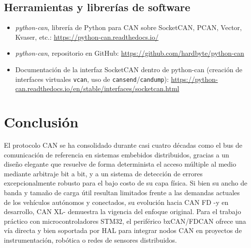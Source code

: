 \documentclass[pdflatex,sn-mathphys-num]{sn-jnl}%
\begin{document}
\subsection{Herramientas y librerías de software}
\begin{itemize}
    \item \textit{python-can}, librería de Python para CAN sobre SocketCAN, PCAN, Vector, Kvaser, etc.: \url{https://python-can.readthedocs.io/}
    \item \textit{python-can}, repositorio en GitHub: \url{https://github.com/hardbyte/python-can}
    \item Documentación de la interfaz SocketCAN dentro de python-can (creación de interfaces virtuales \texttt{vcan}, uso de \texttt{cansend}/\texttt{candump}): \url{https://python-can.readthedocs.io/en/stable/interfaces/socketcan.html}
\end{itemize}

\section{Conclusión}\label{sec:conclusion}
El protocolo CAN se ha consolidado durante casi cuatro décadas como el bus de comunicación de referencia en sistemas embebidos distribuidos, gracias a un diseño elegante que resuelve de forma determinista el acceso múltiple al medio mediante arbitraje bit a bit, y a un sistema de detección de errores excepcionalmente robusto para el bajo costo de su capa física. Si bien su ancho de banda y tamaño de carga útil resultan limitados frente a las demandas actuales de los vehículos autónomos y conectados, su evolución hacia CAN FD -y en desarrollo, CAN XL- demuestra la vigencia del enfoque original. Para el trabajo práctico con microcontroladores STM32, el periférico bxCAN/FDCAN ofrece una vía directa y bien soportada por HAL para integrar nodos CAN en proyectos de instrumentación, robótica o redes de sensores distribuidos.
\end{document}
